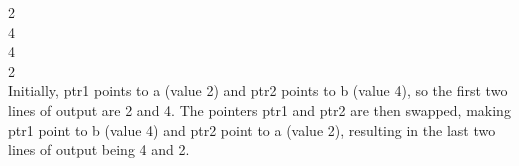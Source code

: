 	\begin{tcolorbox} [colback=white, colframe=black, width=6.7in, arc=0mm, boxrule=1pt]
	\begin{Question}\vspace{3.5in}\end{Question}
	\begin{Solution}
	2\\
	4\\
	4\\
	2\\
	Initially, ptr1 points to a (value 2) and ptr2 points to b (value 4), so the first two lines of output are 2 and 4. The pointers ptr1 and ptr2 are then swapped, making ptr1 point to b (value 4) and ptr2 point to a (value 2), resulting in the last two lines of output being 4 and 2.
	\end{Solution}
	\end{tcolorbox}

   
